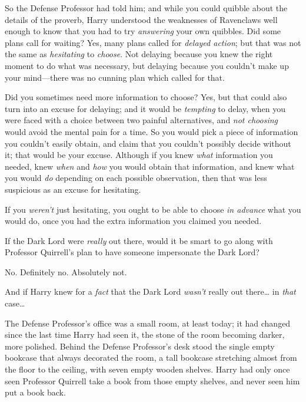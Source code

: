 
 

\hplettrineextrapara
So the Defense Professor had told him; and while you could quibble about the details of the proverb, Harry understood the weaknesses of Ravenclaws well enough to know that you had to try \emph{answering} your own quibbles. Did some plans call for waiting? Yes, many plans called for \emph{delayed action}; but that was not the same as \emph{hesitating} to \emph{choose}. Not delaying because you knew the right moment to do what was necessary, but delaying because you couldn't make up your mind—there was no cunning plan which called for that.

Did you sometimes need more information to choose? Yes, but that could also turn into an excuse for delaying; and it would be \emph{tempting} to delay, when you were faced with a choice between two painful alternatives, and \emph{not choosing} would avoid the mental pain for a time. So you would pick a piece of information you couldn't easily obtain, and claim that you couldn't possibly decide without it; that would be your excuse. Although if you knew \emph{what} information you needed, knew \emph{when} and \emph{how} you would obtain that information, and knew what you would \emph{do} depending on each possible observation, then that was less suspicious as an excuse for hesitating.

If you \emph{weren't} just hesitating, you ought to be able to choose \emph{in advance} what you would do, once you had the extra information you claimed you needed.

If the Dark Lord were \emph{really} out there, would it be smart to go along with Professor Quirrell's plan to have someone impersonate the Dark Lord?

No. Definitely no. Absolutely not.

And if Harry knew for a \emph{fact} that the Dark Lord \emph{wasn't} really out there{\ldots} in \emph{that} case{\ldots}

The Defense Professor's office was a small room, at least today; it had changed since the last time Harry had seen it, the stone of the room becoming darker, more polished. Behind the Defense Professor's desk stood the single empty bookcase that always decorated the room, a tall bookcase stretching almost from the floor to the ceiling, with seven empty wooden shelves. Harry had only once seen Professor Quirrell take a book from those empty shelves, and never seen him put a book back.

